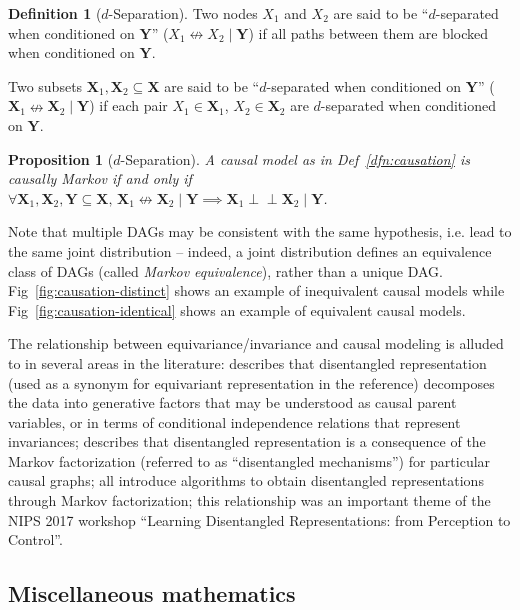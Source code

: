 \documentclass[12pt]{article}
\newcommand{\ci}{\perp\!\!\!\perp}
\newtheorem{prop}[thm]{Proposition}
\theoremstyle{definition}
\newtheorem{dfn}[thm]{Definition}
\numberwithin{equation}{section}
\numberwithin{figure}{section}
\numberwithin{table}{section}
\begin{document}
\begin{dfn}[$d$-Separation]
    Two nodes $X_{1}$ and $X_{2}$ are said to be ``$d$-separated when conditioned on $\mathbf{Y}$'' ($X_1\nleftrightarrow X_2 \mid\mathbf{Y}$) if all paths between them are blocked when conditioned on $\mathbf{Y}$.
    
    Two subsets $\mathbf{X}_1,\mathbf{X}_2\subseteq\mathbf{X}$ are said to be ``$d$-separated when conditioned on $\mathbf{Y}$'' ($\mathbf{X}_1\nleftrightarrow\mathbf{X}_2\mid\mathbf{Y}$) if each pair $X_1\in\mathbf{X}_1$, $X_2\in\mathbf{X}_2$ are $d$-separated when conditioned on $\mathbf{Y}$.
\end{dfn}

\begin{prop}[$d$-Separation]
    \label{prop:causation-dsep}
    A causal model as in Def~\ref{dfn:causation} is causally Markov if and only if $\forall\mathbf{X}_1,\mathbf{X}_2,\mathbf{Y}\subseteq \mathbf{X},\,\mathbf{X}_1\nleftrightarrow\mathbf{X}_2\mid\mathbf{Y}\implies\mathbf{X}_1\ci\mathbf{X}_2\mid\mathbf{Y}$.
\end{prop}

Note that multiple DAGs may be consistent with the same hypothesis, i.e. lead to the same joint distribution -- indeed, a joint distribution defines an equivalence class of DAGs (called \emph{Markov equivalence}), rather than a unique DAG. Fig~\ref{fig:causation-distinct} shows an example of inequivalent causal models while Fig~\ref{fig:causation-identical} shows an example of equivalent causal models.

The relationship between equivariance/invariance and causal modeling is alluded to in several areas in the literature: \cite{oatml} describes that disentangled representation (used as a synonym for equivariant representation in the reference) decomposes the data into generative factors that may be understood as causal parent variables, or in terms of conditional independence relations that represent invariances; \cite{scholkopf} describes that disentangled representation is a consequence of the Markov factorization (referred to as ``disentangled mechanisms'') for particular causal graphs; \cite{kim, higgins2, liu} all introduce algorithms to obtain disentangled representations through Markov factorization; this relationship was an important theme of the NIPS 2017 workshop ``Learning Disentangled Representations: from Perception to Control''. 

\subsection{Miscellaneous mathematics}
\label{sec:math}
\end{document}
